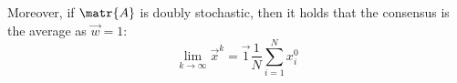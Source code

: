 \begin{subappendices}
\begin{theorem}
    Moreover, if $\matr{A}$ is doubly stochastic, then it holds that the consensus is the average as $\vec{w} = 1$:
    \[ 
        \lim_{k \rightarrow \infty} \vec{x}^k = \vec{1} \frac{1}{N} \sum_{i=1}^N x_i^0
    \]




\end{theorem}
\end{subappendices}
